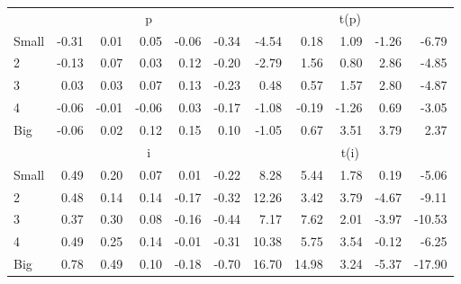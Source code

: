\begin{table}[!ht]
\begin{tabular}{lrrrrrrrrrr}
      & \multicolumn{5}{c}{p} & \multicolumn{5}{c}{t(p)}
    
    \\
      \cmidrule(r){2-6} \cmidrule(r){7-11}

    Small   & -0.31  & 0.01  & 0.05  & -0.06  & -0.34  & -4.54  & 0.18  & 1.09  & -1.26  & -6.79  \\
         2  & -0.13  & 0.07  & 0.03  & 0.12  & -0.20  & -2.79  & 1.56  & 0.80  & 2.86  & -4.85  \\
         3  & 0.03  & 0.03  & 0.07  & 0.13  & -0.23  & 0.48  & 0.57  & 1.57  & 2.80  & -4.87  \\
         4  & -0.06  & -0.01  & -0.06  & 0.03  & -0.17  & -1.08  & -0.19  & -1.26  & 0.69  & -3.05  \\
    Big     & -0.06  & 0.02  & 0.12  & 0.15  & 0.10  & -1.05  & 0.67  & 3.51  & 3.79  & 2.37  \\

  
    
      & \multicolumn{5}{c}{i} & \multicolumn{5}{c}{t(i)}
    
    \\
      \cmidrule(r){2-6} \cmidrule(r){7-11}

    Small   & 0.49  & 0.20  & 0.07  & 0.01  & -0.22  & 8.28  & 5.44  & 1.78  & 0.19  & -5.06  \\
         2  & 0.48  & 0.14  & 0.14  & -0.17  & -0.32  & 12.26  & 3.42  & 3.79  & -4.67  & -9.11  \\
         3  & 0.37  & 0.30  & 0.08  & -0.16  & -0.44  & 7.17  & 7.62  & 2.01  & -3.97  & -10.53  \\
         4  & 0.49  & 0.25  & 0.14  & -0.01  & -0.31  & 10.38  & 5.75  & 3.54  & -0.12  & -6.25  \\
    Big     & 0.78  & 0.49  & 0.10  & -0.18  & -0.70  & 16.70  & 14.98  & 3.24  & -5.37  & -17.90  \\

  

  \bottomrule
\end{tabular}
\label{tbl:25_Size_Inv_F16}
\end{table}